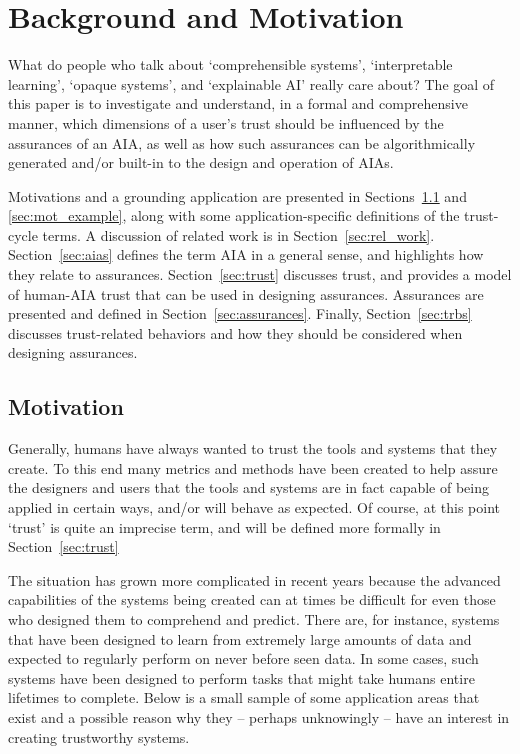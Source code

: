 \section{Background and Motivation} \label{sec:background}

 What do people who talk about `comprehensible systems', `interpretable learning', `opaque systems', and `explainable AI' really care about? The goal of this paper is to investigate and understand, in a formal and comprehensive manner, which dimensions of a user's trust should be influenced by the assurances of an AIA, as well as how such assurances can be algorithmically generated and/or built-in to the design and operation of AIAs.

Motivations and a grounding application are presented in Sections~\ref{sec:motivation} and \ref{sec:mot_example}, along with some application-specific definitions of the trust-cycle terms. A discussion of related work is in Section~\ref{sec:rel_work}. Section~\ref{sec:aias} defines the term AIA in a general sense, and highlights how they relate to assurances. Section~\ref{sec:trust} discusses trust, and provides a model of human-AIA trust that can be used in designing assurances. Assurances are presented and defined in Section~\ref{sec:assurances}. Finally, Section~\ref{sec:trbs} discusses trust-related behaviors and how they should be considered when designing assurances.

\subsection{Motivation} \label{sec:motivation}
    Generally, humans have always wanted to trust the tools and systems that they create.  To this end many metrics and methods have been created to help assure the designers and users that the tools and systems are in fact capable of being applied in certain ways, and/or will behave as expected. Of course, at this point `trust' is quite an imprecise term, and will be defined more formally in Section~\ref{sec:trust}

    The situation has grown more complicated in recent years because the advanced capabilities of the systems being created can at times be difficult for even those who designed them to comprehend and predict. There are, for instance, systems that have been designed to learn from extremely large amounts of data and expected to regularly perform on never before seen data. In some cases, such systems have been designed to perform tasks that might take humans entire lifetimes to complete. Below is a small sample of some application areas that exist and a possible reason why they -- perhaps unknowingly -- have an interest in creating trustworthy systems.


